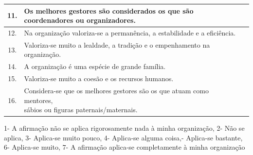 \begin{table}[h!]
\begin{adjustbox}{max width=\textwidth}
\begin{tabular}{ |c|l|c| }
\hline
11. & Os melhores gestores são considerados os que são coordenadores ou organizadores. & \\
\hline
12. & Na organização valoriza-se a permanência, a estabilidade e a eficiência. & \\
\hline
13. & Valoriza-se muito a lealdade, a tradição e o empenhamento na organização. & \\
\hline
14. & A organização é uma espécie de grande família. & \\
\hline
15. & Valoriza-se muito a coesão e os recursos humanos. & \\
\hline
16. & \makecell[l]{Considera-se que os melhores gestores são os que atuam como mentores, \\ sábios ou figuras paternais/maternais.} & \\
\hline
\end{tabular}
\end{adjustbox}
\end{table}\par
{\tiny 1- A afirmação não se aplica rigorosamente nada à minha organização, 2- Não se aplica, 3- Aplica-se muito pouco, 4- Aplica-se alguma coisa,- Aplica-se bastante, 6- Aplica-se muito, 7- A afirmação aplica-se completamente à minha organização
} \\
